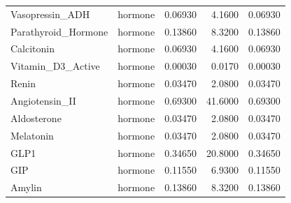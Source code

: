 \documentclass[
]{book}
\begin{document}
\begin{longtable}[t]{llrrr}
\addlinespace
Vasopressin\_ADH & hormone & 0.06930 & 4.1600 & 0.06930\\
Parathyroid\_Hormone & hormone & 0.13860 & 8.3200 & 0.13860\\
Calcitonin & hormone & 0.06930 & 4.1600 & 0.06930\\
Vitamin\_D3\_Active & hormone & 0.00030 & 0.0170 & 0.00030\\
Renin & hormone & 0.03470 & 2.0800 & 0.03470\\
\addlinespace
Angiotensin\_II & hormone & 0.69300 & 41.6000 & 0.69300\\
Aldosterone & hormone & 0.03470 & 2.0800 & 0.03470\\
Melatonin & hormone & 0.03470 & 2.0800 & 0.03470\\
GLP1 & hormone & 0.34650 & 20.8000 & 0.34650\\
GIP & hormone & 0.11550 & 6.9300 & 0.11550\\
\addlinespace
Amylin & hormone & 0.13860 & 8.3200 & 0.13860\\
\bottomrule
\end{longtable}
\end{document}
